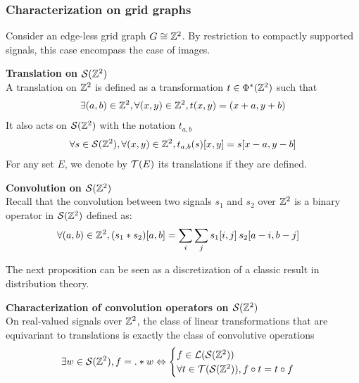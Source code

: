 \subsubsection{Characterization on grid graphs}

Consider an edge-less grid graph \ie $G \cong \bbz^2$. By restriction to compactly supported signals, this case encompass the case of images.

\begin{definition}\textbf{Translation on $\cs(\bbz^2)$}\\
A translation on $\bbz^2$ is defined as a transformation $t \in \Phi^*(\bbz^2)$ such that
\begin{gather*}
\exists (a,b) \in \bbz^2, \forall (x,y) \in \bbz^2, t(x,y) = (x+a,y+b)
\end{gather*}
It also acts on $\cs(\bbz^2)$ with the notation $t_{a,b}$ \ie
\begin{gather*}
\forall s \in \cs(\bbz^2), \forall (x,y) \in \bbz^2, t_{a,b}(s)[x,y] = s[x-a, y-b]
\end{gather*}
For any set $E$, we denote by $\ct(E)$ its translations if they are defined.
\end{definition}

\begin{definition}\textbf{Convolution on $\cs(\bbz^2)$}\\
Recall that the convolution between two signals $s_1$ and $s_2$ over $\bbz^2$ is a binary operator in $\cs(\bbz^2)$ defined as:
\begin{align*}
\forall (a,b) \in \bbz^2, (s_1 * s_2) [a,b] & = \displaystyle \sum_i \sum_j s_1[i,j] \h{2} s_2[a-i, b-j]
\end{align*}
\end{definition}

The next proposition can be seen as a discretization of a classic result in distribution theory.

\begin{proposition}\textbf{Characterization of convolution operators on $\cs(\bbz^2)$}\\
On real-valued signals over $\bbz^2$, the class of linear transformations that are equivariant to translations is exactly the class of convolutive operations \ie
\begin{gather*}
\exists w \in \cs(\bbz^2), f = . \ast w \Leftrightarrow
\begin{cases}
 f \in \cl(\cs(\bbz^2))\\
 \forall t \in \ct(\cs(\bbz^2)), f \circ t = t \circ f
\end{cases}
\end{gather*}
\label{prop:equi}
\end{proposition}

